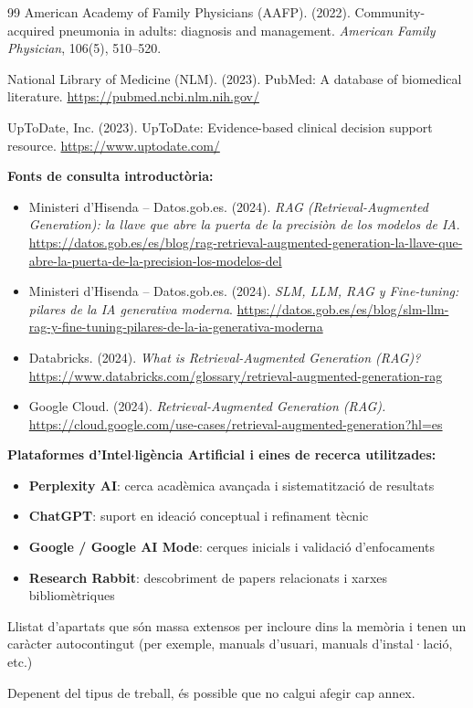 \documentclass[CAT]{TFUOC}%
\begin{document}
\begin{thebibliography}{99}
American Academy of Family Physicians (AAFP). (2022).
\newblock Community-acquired pneumonia in adults: diagnosis and management.
\newblock \textit{American Family Physician}, 106(5), 510--520.

National Library of Medicine (NLM). (2023).
\newblock PubMed: A database of biomedical literature.
\newblock \url{https://pubmed.ncbi.nlm.nih.gov/}

UpToDate, Inc. (2023).
\newblock UpToDate: Evidence-based clinical decision support resource.
\newblock \url{https://www.uptodate.com/}

\end{thebibliography}

\vspace{0.5cm}

\noindent\textbf{Fonts de consulta introduct\`oria:}
\begin{itemize}
\item Ministeri d'Hisenda -- Datos.gob.es. (2024). \textit{RAG (Retrieval-Augmented Generation): la llave que abre la puerta de la precisi\`on de los modelos de IA}. \url{https://datos.gob.es/es/blog/rag-retrieval-augmented-generation-la-llave-que-abre-la-puerta-de-la-precision-los-modelos-del}

\item Ministeri d'Hisenda -- Datos.gob.es. (2024). \textit{SLM, LLM, RAG y Fine-tuning: pilares de la IA generativa moderna}. \url{https://datos.gob.es/es/blog/slm-llm-rag-y-fine-tuning-pilares-de-la-ia-generativa-moderna}

\item Databricks. (2024). \textit{What is Retrieval-Augmented Generation (RAG)?} \url{https://www.databricks.com/glossary/retrieval-augmented-generation-rag}

\item Google Cloud. (2024). \textit{Retrieval-Augmented Generation (RAG).} \url{https://cloud.google.com/use-cases/retrieval-augmented-generation?hl=es}
\end{itemize}

\vspace{0.5cm}

\noindent\textbf{Plataformes d'Intel$\cdot$ligència Artificial i eines de recerca utilitzades:}
\begin{itemize}
\item \textbf{Perplexity AI}: cerca acadèmica avançada i sistematització de resultats
\item \textbf{ChatGPT}: suport en ideació conceptual i refinament tècnic
\item \textbf{Google / Google AI Mode}: cerques inicials i validació d'enfocaments
\item \textbf{Research Rabbit}: descobriment de papers relacionats i xarxes bibliomètriques
\end{itemize}


\newpage
\appendix
Llistat d’apartats que són massa extensos per incloure dins la memòria i tenen un caràcter autocontingut (per exemple, manuals d’usuari, manuals d’instal·lació, etc.)
 
Depenent del tipus de treball, és possible que no calgui afegir cap annex.
\end{document}

